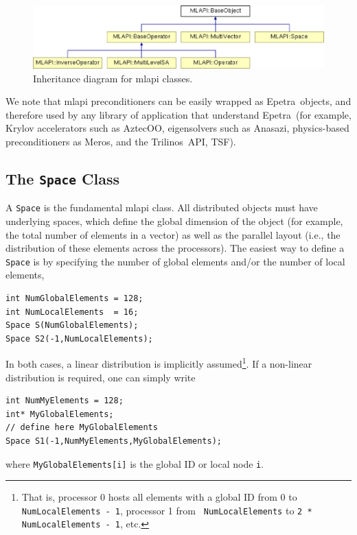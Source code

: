\documentclass{article}[11pt]
\newcommand{\Aztecoo}  {{\sc AztecOO}}
\newcommand{\aztecoo}  {{\Aztecoo}}
\newcommand{\epetra}  {{\sc Epetra}}
\newcommand{\trilinos}  {{\sc Trilinos}}
\newcommand{\meros}  {{\sc Meros}}
\newcommand{\anasazi}  {{\sc Anasazi}}
\newcommand{\MLAPI}  {{\sc mlapi }}
\begin{document}
\begin{figure}
\begin{center}
\includegraphics[width=12cm]{MLAPI_classes.eps}
\caption{Inheritance diagram for \MLAPI classes.}
\label{fig:in}
\end{center}
\end{figure}

We note that \MLAPI preconditioners can be easily wrapped as \epetra\ objects,
  and therefore used by any library of application that understand \epetra\
  (for example, Krylov accelerators such as \aztecoo, eigensolvers such as
   \anasazi, physics-based preconditioners as \meros, and the \trilinos\ API,
   TSF).

\subsection{The {\tt Space} Class}
\label{sec:space}

A {\tt Space} is the fundamental \MLAPI class. All distributed objects must have
underlying spaces, which define the global dimension of the object 
(for example, the total number of elements in a vector) as well as the
 parallel layout (i.e., the distribution of these elements across the
processors). The easiest way to define a {\tt Space} is by specifying the
number of global elements 
and/or the number of local elements,
\begin{verbatim}
int NumGlobalElements = 128;
int NumLocalElements  = 16;
Space S(NumGlobalElements);
Space S2(-1,NumLocalElements);
\end{verbatim}
In both cases, a linear distribution is implicitly 
assumed\footnote{That is, processor 0 hosts all elements with a global ID
  from 0 to {\tt NumLocalElements - 1}, processor 1 from {\tt
    NumLocalElements} to {\tt 2 * NumLocalElements - 1}, etc.}. If a non-linear
distribution is required, one can simply write
\begin{verbatim}
int NumMyElements = 128;
int* MyGlobalElements;
// define here MyGlobalElements
Space S1(-1,NumMyElements,MyGlobalElements);
\end{verbatim}
where {\tt MyGlobalElements[i]} is the global ID or local node {\tt i}.
\end{document}
